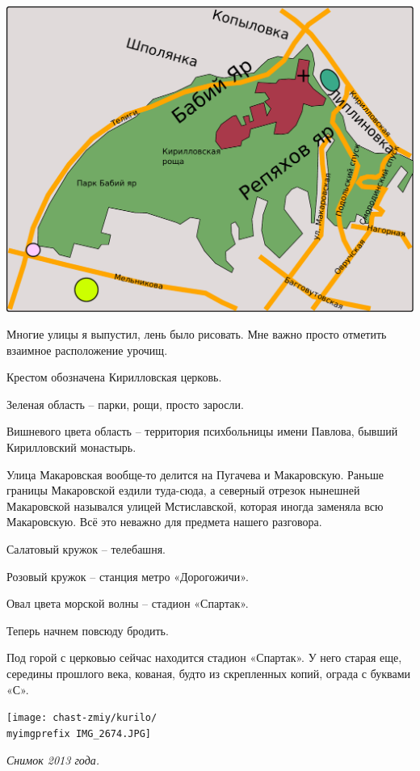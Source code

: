 \begin{center}
\includegraphics[width=\linewidth]{chast-zmiy/kurilo/kyr-okr.pdf}
\end{center}

Многие улицы я выпустил, лень было рисовать. Мне важно просто отметить взаимное расположение урочищ.

Крестом обозначена Кирилловская церковь. 

Зеленая область – парки, рощи, просто заросли.

Вишневого цвета область – территория психбольницы имени Павлова, бывший Кирилловский монастырь.

Улица Макаровская вообще-то делится на Пугачева и Макаровскую. Раньше границы Макаровской ездили туда-сюда, а северный отрезок нынешней Макаровской назывался улицей Мстиславской, которая иногда заменяла всю Макаровскую. Всё это неважно для предмета нашего разговора.

Салатовый кружок – телебашня.

Розовый кружок – станция метро «Дорогожичи».

Овал цвета морской волны – стадион «Спартак».

Теперь начнем повсюду бродить.

Под горой с церковью сейчас находится стадион «Спа\-ртак». У него старая еще, середины прошлого века, кованая, будто из скрепленных копий, ограда с буквами «С».

\begin{center}
\texttt{[image: chast-zmiy/kurilo/\\myimgprefix IMG\_2674.JPG]}

\textit{Снимок 2013 года.}
\end{center}

